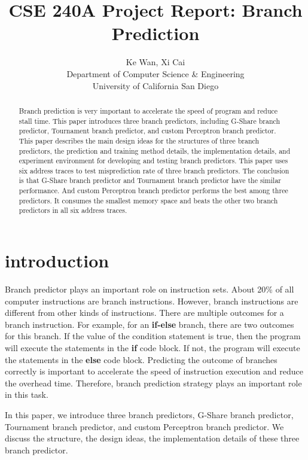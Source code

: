 \documentclass[conference]{IEEEtran}
\title{CSE 240A Project Report: Branch Prediction}
\author{Ke Wan, Xi Cai \\
Department of Computer Science \& Engineering \\
University of California San Diego

}
\begin{document}
\maketitle
\thispagestyle{firstpage}
\pagestyle{plain}




\begin{abstract}

Branch prediction is very important to accelerate the speed of program and reduce stall time. This paper introduces three branch predictors, including G-Share branch predictor, Tournament branch predictor, and custom Perceptron branch predictor. This paper describes the main design ideas for the 
structures of three branch predictors, the prediction and training method details, the implementation details, and experiment environment for developing and testing branch predictors. This paper uses six 
address traces to test misprediction rate of three branch predictors. The conclusion is that G-Share branch predictor and Tournament branch predictor have the similar performance. And custom Perceptron branch predictor performs 
the best among three predictors. It consumes the smallest memory space and beats the other two branch predictors in all six address traces. 

\end{abstract}

\section{introduction}
Branch predictor plays an important role on instruction sets. About 20\% of all computer instructions are branch instructions. However, branch instructions are
different from other kinds of instructions. There are multiple outcomes for a branch instruction. For example, for an \textbf{if-else} branch, there are two outcomes for this branch. 
If the value of the condition statement is true, then the program will execute the statements in the \textbf{if} code block. If not, the program will execute the statements
in the \textbf{else} code block. Predicting the outcome of branches correctly is important to accelerate the speed of instruction execution and reduce the overhead time. Therefore, branch
prediction strategy plays an important role in this task. 

In this paper, we introduce three branch predictors, G-Share branch predictor, Tournament branch
predictor, and custom Perceptron branch predictor. We discuss the structure, the design ideas, the implementation details of these three branch predictor.
\end{document}
